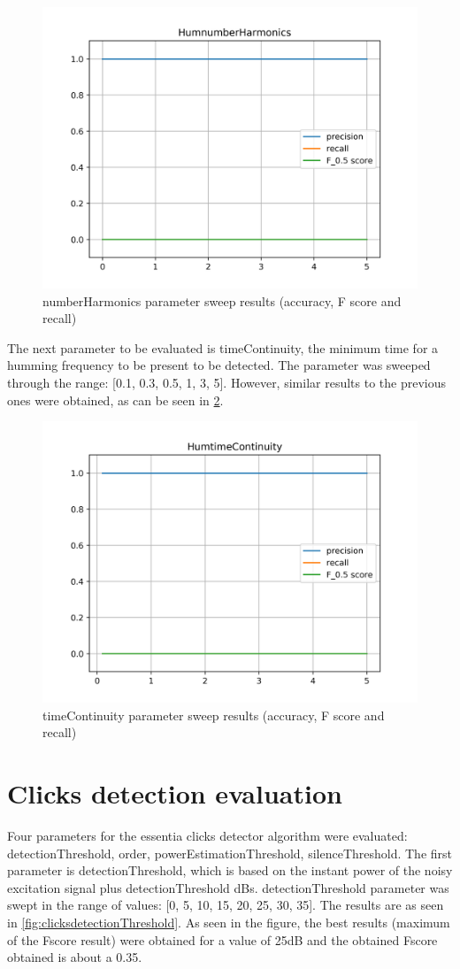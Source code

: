 \begin{figure}[H]
	\centering
	\includegraphics[clip,width=0.7\columnwidth]{Figures/HumnumberHarmonics.png}%
	\caption{numberHarmonics parameter sweep results (accuracy, F score and recall)}
	\label{fig:humnumberHarmonics}
\end{figure}

The next parameter to be evaluated is timeContinuity, the minimum time for a humming frequency to be present to be detected. The parameter was sweeped through the range: [0.1, 0.3, 0.5, 1, 3, 5]. However, similar results to the previous ones were obtained, as can be seen in \ref{fig:humtimeContinuity}.

\begin{figure}[H]
	\centering
	\includegraphics[clip,width=0.7\columnwidth]{Figures/HumtimeContinuity.png}%
	\caption{timeContinuity parameter sweep results (accuracy, F score and recall)}
	\label{fig:humtimeContinuity}
\end{figure}

\section{Clicks detection evaluation}
Four parameters for the essentia clicks detector algorithm were evaluated: detectionThreshold, order, powerEstimationThreshold, silenceThreshold. The first parameter is detectionThreshold, which is based on the instant power of the noisy excitation signal plus detectionThreshold dBs. detectionThreshold parameter was swept in the range of values: [0, 5, 10, 15, 20, 25, 30, 35]. The results are as seen in \ref{fig:clicksdetectionThreshold}. As seen in the figure, the best results (maximum of the Fscore result) were obtained for a value of 25dB and the obtained Fscore obtained is about a 0.35.

